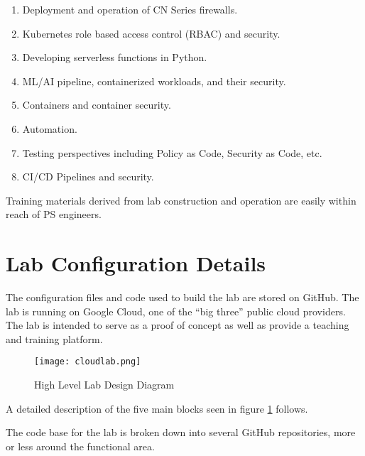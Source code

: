 \begin{raggedright}
	\begin{enumerate}
		\item Deployment and operation of CN Series firewalls.
		\item Kubernetes role based access control (RBAC) and security.
		\item Developing serverless functions in Python.
		\item ML/AI pipeline, containerized workloads, and their security.
		\item Containers and container security.
		\item Automation.
		\item Testing perspectives including Policy as Code, Security as Code, etc.
		\item CI/CD Pipelines and security.
	\end{enumerate}
\end{raggedright}
\vspace{2mm}

\justifying
Training materials derived from lab construction and operation are easily within reach of PS engineers. 


\section{\label{sec:Lab}Lab Configuration Details}
\vspace{2mm}
\justifying
The configuration files and code used to build the lab are stored on GitHub. The lab is running on Google Cloud, one of the ``big three'' public cloud providers.
The lab is intended to serve as a proof of concept as well as provide a teaching and training platform.

\begin{figure}[ht]
  \texttt{[image: cloudlab.png]}
  \caption{High Level Lab Design Diagram}
  \label{design}
\end{figure}

\justifying
A detailed description of the five main blocks seen in figure \ref{design} follows.

\newpage
{}

\justifying
The code base for the lab is broken down into several GitHub repositories, more or less around the functional area. 

